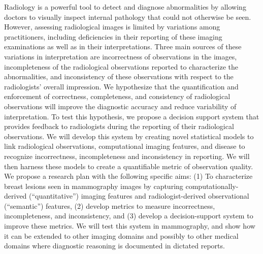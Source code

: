 Radiology is a powerful tool to detect and diagnose abnormalities by allowing doctors to visually inspect internal pathology that could not otherwise be seen. However, assessing radiological images is limited by variations among practitioners, including deficiencies in their reporting of these imaging examinations as well as in their interpretations. Three main sources of these variations in interpretation are incorrectness of observations in the images, incompleteness of the radiological observations reported to characterize the abnormalities, and inconsistency of these observations with respect to the radiologists' overall impression. We hypothesize that the quantification and enforcement of correctness, completeness, and consistency of radiological observations will improve the diagnostic accuracy and reduce variability of interpretation. To test this hypothesis, we propose a decision support system that provides feedback to radiologists during the reporting of their radiological observations. We will develop this system by creating novel statistical models to link radiological observations, computational imaging features, and disease to recognize incorrectness, incompleteness and inconsistency in reporting. We will then harness these models to create a quantifiable metric of observation quality. We propose a research plan with the following specific aims: (1) To characterize breast lesions seen in mammography images by capturing computationally-derived (``quantitative'') imaging features and radiologist-derived observational (``semantic'') features, (2) develop metrics to measure incorrectness, incompleteness, and inconsistency, and (3) develop a decision-support system to improve these metrics. We will test this system in mammography, and show how it can be extended to other imaging domains and possibly to other medical domains where diagnostic reasoning is documented in dictated reports.

